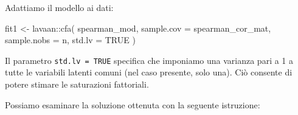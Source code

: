 \documentclass[
  11pt,
]{krantz}
\makeatletter
\newenvironment{Shaded}{\begin{snugshade}}{\end{snugshade}}
\newcommand{\AttributeTok}[1]{\textcolor[rgb]{0.61,0.61,0.61}{#1}}
\newcommand{\ConstantTok}[1]{\textcolor[rgb]{0,0,0}{#1}}
\newcommand{\FunctionTok}[1]{\textcolor[rgb]{0,0,0}{#1}}
\newcommand{\NormalTok}[1]{#1}
\newcommand{\OtherTok}[1]{\textcolor[rgb]{0.37,0.37,0.37}{#1}}
\newcommand{\SpecialCharTok}[1]{\textcolor[rgb]{0,0,0}{#1}}
\newenvironment{kframe}{%
\medskip{}
\setlength{\fboxsep}{.8em}
 \def\at@end@of@kframe{}%
 \ifinner\ifhmode%
  \def\at@end@of@kframe{\end{minipage}}%
  \begin{minipage}{\columnwidth}%
 \fi\fi%
 \def\FrameCommand##1{\hskip\@totalleftmargin \hskip-\fboxsep
 \colorbox{shadecolor}{##1}\hskip-\fboxsep
     \hskip-\linewidth \hskip-\@totalleftmargin \hskip\columnwidth}%
 \MakeFramed {\advance\hsize-\width
   \@totalleftmargin\z@ \linewidth\hsize
   \@setminipage}}%
 {\par\unskip\endMakeFramed%
 \at@end@of@kframe}
\renewenvironment{Shaded}{\begin{kframe}}{\end{kframe}}
\theoremstyle{definition}
\theoremstyle{definition}
\theoremstyle{definition}
\theoremstyle{definition}
\theoremstyle{remark}
\makeatother
\begin{document}
Adattiamo il modello ai dati:

\begin{Shaded}
\begin{Highlighting}[]
\NormalTok{fit1 }\OtherTok{\textless{}{-}}\NormalTok{ lavaan}\SpecialCharTok{::}\FunctionTok{cfa}\NormalTok{(}
\NormalTok{  spearman\_mod,}
  \AttributeTok{sample.cov =}\NormalTok{ spearman\_cor\_mat,}
  \AttributeTok{sample.nobs =}\NormalTok{ n,}
  \AttributeTok{std.lv =} \ConstantTok{TRUE}
\NormalTok{)}
\end{Highlighting}
\end{Shaded}

Il parametro \texttt{std.lv\ =\ TRUE} specifica che imponiamo una varianza pari a 1 a tutte le variabili latenti comuni (nel caso presente, solo una). Ciò consente di potere stimare le saturazioni fattoriali.

Possiamo esaminare la soluzione ottenuta con la seguente istruzione:
\end{document}
